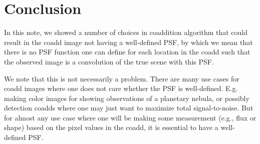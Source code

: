 \documentclass[modern]{style_and_logos/lsstdescnote}
\newcommand{\rachel}[1]{{\color{magenta}RM: #1}}
\newcommand{\mike}[1]{{\color{cyan}MJ: #1}}
\begin{document}
\section{Conclusion}

In this note, we showed a number of choices in coaddition algorithm that could result
in the coadd image not having a well-defined PSF, by which we mean that there is no
PSF function one can define for each location in the coadd such that the observed image is a convolution
of the true scene with this PSF.

We note that this is not necessarily a problem.  There are many use cases for coadd images
where one does not care whether the PSF is well-defined.  E.g. making color images
for showing observations of a planetary nebula, or possibly detection coadds where one may just want to maximize total signal-to-noise.
But for almost any use case where one will
be making some measurement (e.g., flux or shape) based on the pixel values in the coadd,
it is essential to have a well-defined PSF.
\end{document}
